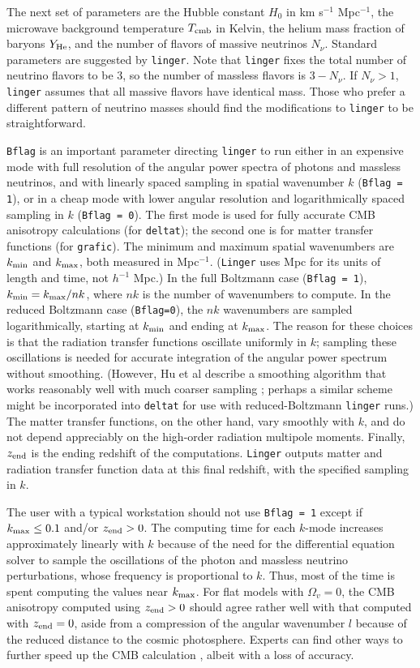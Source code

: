 The next set of parameters are the Hubble constant $H_0$ in km s$^{-1}$
Mpc$^{-1}$, the microwave background temperature $T_{\rm cmb}$ in Kelvin,
the helium mass fraction of baryons $Y_{\rm He}$, and the number of
flavors of massive neutrinos $N_\nu$.  Standard parameters are suggested
by {\tt linger}.  Note that {\tt linger} fixes the total number of neutrino
flavors to be 3, so the number of massless flavors is $3-N_\nu$.  If
$N_\nu>1$, {\tt linger} assumes that all massive flavors have identical
mass.  Those who prefer a different pattern of neutrino masses should find
the modifications to {\tt linger} to be straightforward.

{\tt Bflag} is an important parameter directing {\tt linger} to run either
in an expensive mode with full resolution of the  angular power spectra
of photons and massless neutrinos, and with linearly spaced sampling in
spatial wavenumber $k$ ({\tt Bflag = 1}), or in a cheap mode with lower
angular resolution and logarithmically spaced sampling in $k$ ({\tt Bflag
= 0}).  The first mode is used for fully accurate CMB anisotropy calculations
(for {\tt deltat}); the second one is for matter transfer functions (for
{\tt grafic}).  The minimum and maximum spatial wavenumbers are $k_{\rm min}$
and $k_{\rm max}$, both measured in Mpc$^{-1}$.  ({\tt Linger} uses Mpc for
its units of length and time, not $h^{-1}$ Mpc.)  In the full Boltzmann case
({\tt Bflag = 1}), $k_{\rm min}=k_{\rm max}/nk$, where $nk$ is the number
of wavenumbers to compute.  In the reduced Boltzmann case ({\tt Bflag=0}),
the $nk$ wavenumbers are sampled logarithmically, starting at $k_{\rm min}$
and ending at $k_{\rm max}$.  The reason for these choices is that the
radiation transfer functions oscillate uniformly in $k$; sampling these
oscillations is needed for accurate integration of the angular power
spectrum without smoothing.  (However, Hu et al describe a smoothing
algorithm that works reasonably well with much coarser sampling \cite{hu};
perhaps a similar scheme might be incorporated into {\tt deltat} for
use with reduced-Boltzmann {\tt linger} runs.)  The matter transfer functions,
on the other hand, vary smoothly with $k$, and do not depend appreciably
on the high-order radiation multipole moments.  Finally, $z_{\rm end}$ is
the ending redshift of the computations.  {\tt Linger} outputs matter and
radiation transfer function data at this final redshift, with the specified
sampling in $k$.

The user with a typical workstation should not use {\tt Bflag = 1} except
if $k_{\rm max}\le0.1$ and/or $z_{\rm end}>0$.  The computing time for
each $k$-mode increases approximately linearly with $k$ because of the
need for the differential equation solver to sample the oscillations of
the photon and massless neutrino perturbations, whose frequency is
proportional to $k$.  Thus, most of the time is spent computing the
values near $k_{\rm max}$.  For flat models with $\Omega_v=0$, the CMB
anisotropy computed using $z_{\rm end}>0$ should agree rather well with
that computed with $z_{\rm end}=0$, aside from a compression of the
angular wavenumber $l$ because of the reduced distance to the cosmic
photosphere.  Experts can find other ways to further speed up the
CMB calculation \cite{hu}, albeit with a loss of accuracy.

